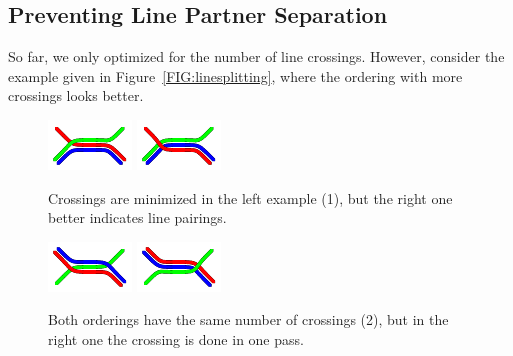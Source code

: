 \documentclass{llncs}
\begin{document}
\subsection{Preventing Line Partner Separation}\label{SEC:separation}
So far, we only optimized for the number of line crossings. However, consider the example given in Figure~\ref{FIG:linesplitting}, where the ordering with more crossings looks better.
\begin{figure}
\centering
\begin{minipage}{.48\textwidth}
  \centering
	\includegraphics[angle=270,origin=c,width=.3\textwidth]{render_examples/splitting_example_nonopt.pdf}\hspace{10pt}
	\includegraphics[angle=270,origin=c,width=.3\textwidth]{render_examples/splitting_example.pdf}
	\caption{Crossings are minimized in the left example (1), but the right one better indicates line pairings.}
	\label{FIG:linesplitting}
\end{minipage}%
\hfill
\begin{minipage}{.48\textwidth}
  \centering
	\includegraphics[angle=90,origin=c,width=.3\textwidth]{render_examples/splitting_example2_nonopt.pdf}\hspace{10pt}
	\includegraphics[angle=90,origin=c,width=.3\textwidth]{render_examples/splitting_example2.pdf}
	\caption{Both orderings have the same number of crossings (2), but in the right one the
crossing is done in one pass.}
	\label{FIG:linesplitting2}
\end{minipage}
\end{figure}
\end{document}
